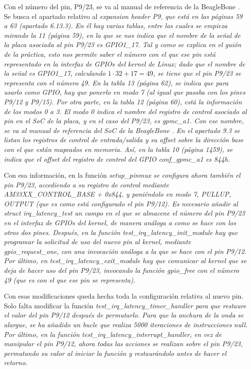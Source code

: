 \documentclass[../main.tex]{subfiles}
\begin{document}
Con el número del pin, P9/23, se va al manual de referencia de la BeagleBone \cite{manual-placa}. Se busca el apartado relativo al \it{expansion header P9}, que está en las páginas 59 a 63 (apartado 6.13.3). En él hay varias tablas, entre las cuales se empieza mirando la 11 (página 59), en la que se nos indica que el nombre de la señal de la placa asociada al pin P9/23 es GPIO1\_17. Tal y como se explica en el guión de la práctica, esto nos permite saber el número con el que ese pin está representado en la interfaz de GPIOs del kernel de Linux; dado que el nombre de la señal es GPIO1\_17, calculando \(1 \cdot 32 + 17 = 49\), se tiene que el pin P9/23 se representa con el número 49. En la tabla 13 (página 62), se indica que para usarlo como GPIO, hay que ponerlo en modo 7 (al igual que pasaba con los pines P9/12 y P9/15). Por otra parte, en la tabla 12 (página 60), está la información de los modos 0 a 3. El modo 0 indica el nombre del registro de control asociado al pin en el SoC de la placa, y en el caso del P9/23, es \it{gpmc\_a1}. Con ese nombre, se va al manual de referencia del SoC de la BeagleBone \cite{manual-soc}. En el apartado 9.3 se listan los registros de control de entrada/salida y su offset sobre la dirección base con el que están mapeados en memoria. Así, en la tabla 10 (página 1459), se indica que el offset del registro de control del GPIO \it{conf\_gpmc\_a1} es \it{844h}.

Con esa información, en la función \it{setup\_pinmux} se configura ahora también el pin P9/23, accediendo a su registro de control mediante \it{AM33XX\_CONTROL\_BASE + 0x844}, y poniéndolo en modo 7, PULLUP, OUTPUT (que es como está configurado el pin P9/12). Es necesario añadir al struct \it{irq\_latency\_test} un campo en el que se almacene el número del pin P9/23 en el interfaz de GPIOs del kernel, de manera análoga a como se hace con los otros dos pines. Después, en la función \it{test\_irq\_latency\_init\_module} hay que programar la solicitud de uso del nuevo pin al kernel, mediante \it{gpio\_request\_one}, con una invocación análoga a la que se hace con el pin P9/12. Por último, en \it{test\_irq\_latency\_exit\_module} hay que comunicar al kernel que se deja de hacer uso del pin P9/23, invocando la función \it{gpio\_free} con el número 49 (que es con el que ese pin se representa).

Con esas modificaciones queda hecha toda la configuración relativa al nuevo pin. Solo falta modificar la función \it{test\_irq\_latency\_timer\_handler} para que restaure el valor del pin P9/12 después de permutarlo. Para que la anchura de la onda se alargue, se ha añadido un bucle que realiza 5000 iteraciones de instrucciones null. Por último, en la función \it{test\_irq\_latency\_interrupt\_handler}, en vez de manipular el pin P9/12, ahora todas las acciones se realizan sobre el pin P9/23, permutando su valor al iniciar la función y restaurándolo antes de hacer el retorno.
\end{document}
